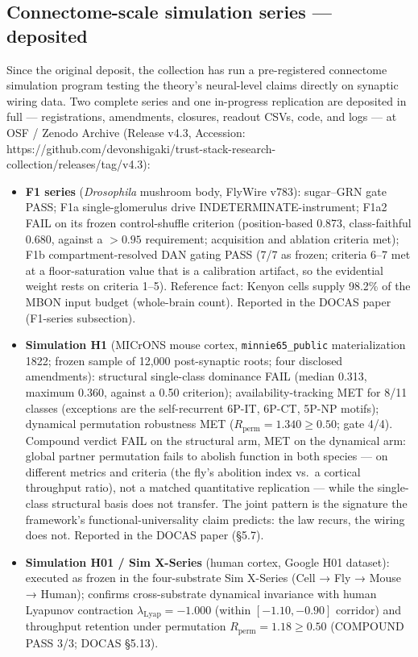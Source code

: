 \documentclass[
]{article}
\begin{document}
\subsection{Connectome-scale simulation series ---
deposited}\label{connectome-scale-simulation-series-deposited}

Since the original deposit, the collection has run a pre-registered
connectome simulation program testing the theory's neural-level claims
directly on synaptic wiring data. Two complete series and one
in-progress replication are deposited in full --- registrations,
amendments, closures, readout CSVs, code, and logs --- at OSF / Zenodo
Archive (Release v4.3, Accession:
https://github.com/devonshigaki/trust-stack-research-collection/releases/tag/v4.3):

\begin{itemize}
\item
  \textbf{F1 series} (\emph{Drosophila} mushroom body, FlyWire v783):
  sugar--GRN gate PASS; F1a single-glomerulus drive
  INDETERMINATE-instrument; F1a2 FAIL on its frozen control-shuffle
  criterion (position-based 0.873, class-faithful 0.680, against a
  \(>0.95\) requirement; acquisition and ablation criteria met); F1b
  compartment-resolved DAN gating PASS (7/7 as frozen; criteria 6--7 met
  at a floor-saturation value that is a calibration artifact, so the
  evidential weight rests on criteria 1--5). Reference fact: Kenyon
  cells supply 98.2\% of the MBON input budget (whole-brain count).
  Reported in the DOCAS paper (F1-series subsection).
\item
  \textbf{Simulation H1} (MICrONS mouse cortex,
  \texttt{minnie65\_public} materialization 1822; frozen sample of
  12,000 post-synaptic roots; four disclosed amendments): structural
  single-class dominance FAIL (median 0.313, maximum 0.360, against a
  0.50 criterion); availability-tracking MET for 8/11 classes
  (exceptions are the self-recurrent 6P-IT, 6P-CT, 5P-NP motifs);
  dynamical permutation robustness MET
  (\(R_{\mathrm{perm}} = 1.340 \geq 0.50\); gate 4/4). Compound verdict
  FAIL on the structural arm, MET on the dynamical arm: global partner
  permutation fails to abolish function in both species --- on different
  metrics and criteria (the fly's abolition index vs.~a cortical
  throughput ratio), not a matched quantitative replication --- while
  the single-class structural basis does not transfer. The joint pattern
  is the signature the framework's functional-universality claim
  predicts: the law recurs, the wiring does not. Reported in the DOCAS
  paper (§5.7).
\item
  \textbf{Simulation H01 / Sim X-Series} (human cortex, Google H01
  dataset): executed as frozen in the four-substrate Sim X-Series (Cell
  → Fly → Mouse → Human); confirms cross-substrate dynamical invariance
  with human Lyapunov contraction \(\lambda_{\mathrm{Lyap}} = -1.000\)
  (within \([-1.10, -0.90]\) corridor) and throughput retention under
  permutation \(R_{\mathrm{perm}} = 1.18 \ge 0.50\) (COMPOUND PASS 3/3;
  DOCAS §5.13).
\end{itemize}
\end{document}
